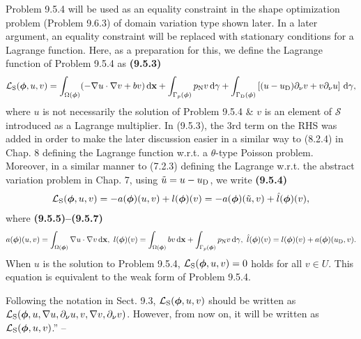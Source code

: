 \documentclass[oneside]{book}
\numberwithin{equation}{section}
\begin{document}
Problem 9.5.4 will be used as an equality constraint in the shape optimization problem (Problem 9.6.3) of domain variation type shown later. In a later argument, an equality constraint will be replaced with stationary conditions for a Lagrange function. Here, as a preparation for this, we define the Lagrange function of Problem 9.5.4 as \textbf{(9.5.3)}
\begin{align*}
	\mathcal{L}_{\rm S}(\boldsymbol{\phi},u,v) = \int_{\Omega(\boldsymbol{\phi})} (-\nabla u\cdot\nabla v + bv)\,{\rm d}{\bf x} + \int_{\Gamma_p(\boldsymbol{\phi})} p_{\rm N}v\,{\rm d}\gamma + \int_{\Gamma_{\rm D}(\boldsymbol{\phi})} \left[(u - u_{\rm D})\partial_\nu v + v\partial_\nu u\right]\,{\rm d}\gamma,
\end{align*}
where $u$ is not necessarily the solution of Problem 9.5.4 \& $v$ is an element of $\mathcal{S}$ introduced as a Lagrange multiplier. In (9.5.3), the 3rd term on the RHS was added in order to make the later discussion easier in a similar way to (8.2.4) in Chap. 8 defining the Lagrange function w.r.t. a $\theta$-type Poisson problem. Moreover, in a similar manner to (7.2.3) defining the Lagrange w.r.t. the abstract variation problem in Chap. 7, using $\tilde{u} = u - u_{\rm D}$, we write \textbf{(9.5.4)}
\begin{align*}
	\mathcal{L}_{\rm S}(\boldsymbol{\phi},u,v) = -a(\boldsymbol{\phi})(u,v) + l(\boldsymbol{\phi})(v) = -a(\boldsymbol{\phi})(\tilde{u},v) + \hat{l}(\boldsymbol{\phi})(v),
\end{align*}
where \textbf{(9.5.5)--(9.5.7)}
\begin{align*}
	a(\boldsymbol{\phi})(u,v) = \int_{\Omega(\boldsymbol{\phi})} \nabla u\cdot\nabla v\,{\rm d}{\bf x},\ l(\boldsymbol{\phi})(v) = \int_{\Omega(\boldsymbol{\phi})} bv\,{\rm d}{\bf x} + \int_{\Gamma_p(\boldsymbol{\phi})} p_{\rm N}v\,{\rm d}\gamma,\ \hat{l}(\boldsymbol{\phi})(v) = l(\boldsymbol{\phi})(v) + a(\boldsymbol{\phi})(u_{\rm D},v).
\end{align*}
When $u$ is the solution to Problem 9.5.4, $\mathcal{L}_{\rm S}(\boldsymbol{\phi},u,v) = 0$ holds for all $v\in U$. This equation is equivalent to the weak form of Problem 9.5.4.

Following the notation in Sect. 9.3, $\mathcal{L}_{\rm S}(\boldsymbol{\phi},u,v)$ should be written as $\mathcal{L}_{\rm S}(\boldsymbol{\phi},u,\nabla u,\partial_\nu u,v,\nabla v,\partial_\nu v)$. However, from now on, it will be written as $\mathcal{L}_{\rm S}(\boldsymbol{\phi},u,v)$.'' -- \cite[pp. 464--467]{Azegami2020}
\end{document}
